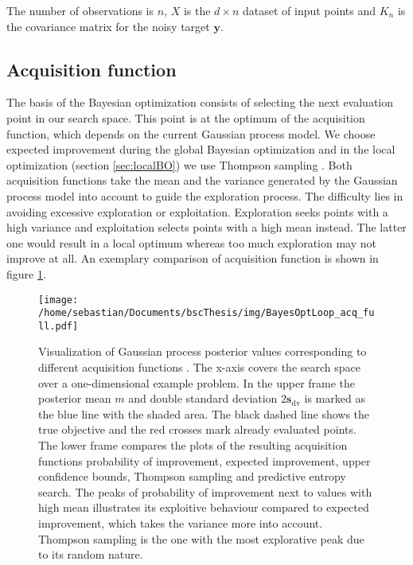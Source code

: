 The number of observations is $n$, $X$ is the $d \times n$ dataset of input points and $K_n$ is the covariance matrix for the noisy target $\mathbf{y}$.

\subsection{Acquisition function}
The basis of the Bayesian optimization consists of selecting the next evaluation point in our search space. This point is at the optimum of the acquisition function, which depends on the current Gaussian process model. We choose expected improvement \cite{brochu2010tutorial} during the global Bayesian optimization and in the local optimization (section \ref{sec:localBO}) we use Thompson sampling \cite{akrour2017local}. Both acquisition functions take the mean and the variance generated by the Gaussian process model into account to guide the exploration process. The difficulty lies in avoiding excessive exploration or exploitation. Exploration seeks points with a high variance and exploitation selects points with a high mean instead. The latter one would result in a local optimum whereas too much exploration may not improve at all. An exemplary comparison of acquisition function is shown in figure \ref{fig:acqFcn}.

\begin{figure}[h]
    \centering
    \texttt{[image: /home/sebastian/Documents/bscThesis/img/BayesOptLoop\_acq\_full.pdf]}
    \caption{Visualization of Gaussian process posterior values corresponding to different acquisition functions \cite{shahriari2016taking}. The x-axis covers the search space over a one-dimensional example problem. In the upper frame the posterior mean $m$ and double standard deviation $2 \mathbf{s}_{\mathrm{dv}}$ is marked as the blue line with the shaded area. The black dashed line shows the true objective and the red crosses mark already evaluated points. The lower frame compares the plots of the resulting acquisition functions probability of improvement, expected improvement, upper confidence bounds, Thompson sampling and predictive entropy search. The peaks of probability of improvement next to values with high mean illustrates its exploitive behaviour compared to expected improvement, which takes the variance more into account. Thompson sampling is the one with the most explorative peak due to its random nature. \label{fig:acqFcn}}
\end{figure}

